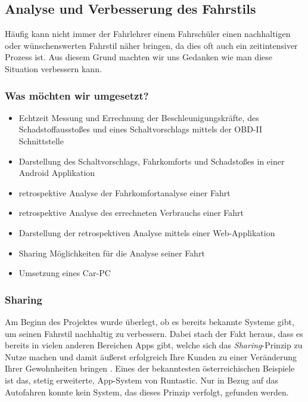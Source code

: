 \subsection{Analyse und Verbesserung des Fahrstils}

Häufig kann nicht immer der Fahrlehrer einem Fahrschüler einen nachhaltigen oder wünschenswerten Fahrstil näher bringen, da dies oft auch ein zeitintensiver Prozess ist. Aus diesem Grund machten wir uns Gedanken wie man diese Situation verbessern kann.

\subsubsection{Was möchten wir umgesetzt?}
\begin{itemize}
	\item Echtzeit Messung und Errechnung der Beschleunigungskräfte, des Schadstoffausstoßes und eines Schaltvorschlags mittels der OBD-II Schnittstelle
	\item Darstellung des Schaltvorschlags, Fahrkomforts und Schadstoßes in einer Android Applikation
	\item retrospektive Analyse der Fahrkomfortanalyse einer Fahrt
	\item retrospektive Analyse des errechneten Verbrauchs einer Fahrt
	\item Darstellung der retrospektiven Analyse mittels einer Web-Applikation
	\item Sharing Möglichkeiten für die Analyse seiner Fahrt
	\item Umsetzung eines Car-PC
\end{itemize}

\subsubsection{Sharing}
Am Beginn des Projektes wurde überlegt, ob es bereits bekannte Systeme gibt, um seinen Fahrstil nachhaltig zu verbessern. Dabei stach der Fakt heraus, dass es bereits in vielen anderen Bereichen Apps gibt, welche sich das \textit{Sharing}-Prinzip zu Nutze machen und damit äußerst erfolgreich Ihre Kunden zu einer Veränderung Ihrer Gewohnheiten bringen \cite{SIMR.CH1-fahrstil-analyse.GewohnheitenLoslassen}. Eines der bekanntesten österreichischen Beispiele ist das, stetig erweiterte, App-System von Runtastic. \cite{SIMR.CH1-Fahrstil-Analyse.BusinessplanRuntastic}
Nur in Bezug auf das Autofahren konnte kein System, das dieses Prinzip verfolgt, gefunden werden.


